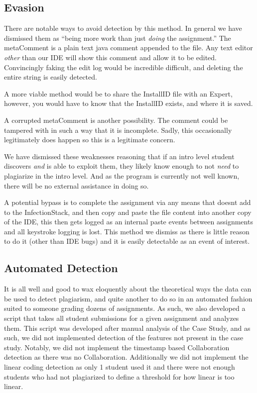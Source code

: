 \documentclass[letterpaper,10pt,conference]{IEEEtran}
\newcommand{\installID}{InstallID\xspace}
\newcommand{\metaComment}{metaComment\xspace}
\newcommand{\infectionStack}{InfectionStack\xspace}
\begin{document}
\subsection{Evasion}
There are notable ways to avoid detection by this method.  In general we have dismissed them as ``being more work than just \textit{doing} the assignment.''  The \metaComment is a plain text java comment appended to the file.  Any text editor \textit{other} than our IDE will show this comment and allow it to be edited.  Convincingly faking the edit log would be incredible difficult, and deleting the entire string is easily detected.

A more viable method would be to share the \installID file with an Expert, however, you would have to know that the \installID exists, and where it is saved.


A corrupted \metaComment is another possibility.  The comment could be tampered with in such a way that it is incomplete.  Sadly, this occasionally legitimately does happen so this is a legitimate concern.

We have dismissed these weaknesses reasoning that if an intro level student discovers \textit{and} is able to exploit them, they likely know enough to not \textit{need} to plagiarize in the intro level.  And as the program is currently not well known, there will be no external assistance in doing so.

A potential bypass is to complete the assignment via any means that doesnt add to the \infectionStack, and then copy and paste the file content into another copy of the IDE, this then gets logged as an internal paste events between assignments and all keystroke logging is lost.  This method we dismiss as there is little reason to do it (other than IDE bugs) and it is easily detectable as an event of interest.
\subsection{Automated Detection}
It is all well and good to wax eloquently about the theoretical ways the data can be used to detect plagiarism, and quite another to do so in an automated fashion suited to someone grading dozens of assignments.  As such, we also developed a script that takes all student submissions for a given assignment and analyzes them.  This script was developed after manual analysis of the Case Study, and as such, we did not implemented detection of the features not present in the case study.  Notably, we did not implement the timestamp based Collaboration detection as there was no Collaboration. Additionally we did not implement the linear coding detection as only 1 student used it and there were not enough students who had not plagiarized to define a threshold for how linear is too linear.  
\end{document}
